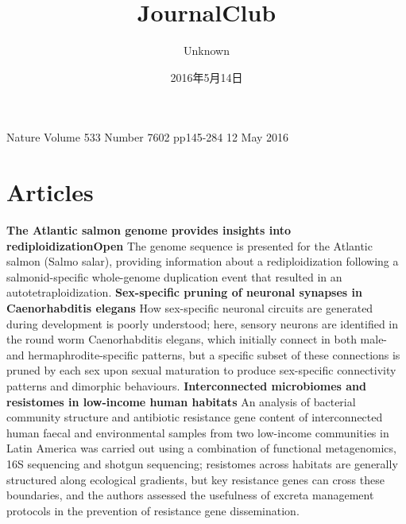 \documentclass[a4j]{jsarticle}
\begin{document}
\title{\vspace{-1.5cm}JournalClub}
\author{Unknown}
\date{2016年5月14日\vspace{-0.3cm}}
\maketitle
\noindent
Nature Volume 533 Number 7602 pp145-284 12 May 2016
\vspace{-5mm}
\section{Articles}
\noindent\textbf{The Atlantic salmon genome provides insights into rediploidizationOpen}
The genome sequence is presented for the Atlantic salmon (Salmo salar), providing information about a rediploidization following a salmonid-specific whole-genome duplication event that resulted in an autotetraploidization.
\vspace{3mm}
\noindent\textbf{Sex-specific pruning of neuronal synapses in Caenorhabditis elegans}
How sex-specific neuronal circuits are generated during development is poorly understood; here, sensory neurons are identified in the round worm Caenorhabditis elegans, which initially connect in both male- and hermaphrodite-specific patterns, but a specific subset of these connections is pruned by each sex upon sexual maturation to produce sex-specific connectivity patterns and dimorphic behaviours.
\vspace{3mm}
\noindent\textbf{Interconnected microbiomes and resistomes in low-income human habitats}
An analysis of bacterial community structure and antibiotic resistance gene content of interconnected human faecal and environmental samples from two low-income communities in Latin America was carried out using a combination of functional metagenomics, 16S sequencing and shotgun sequencing; resistomes across habitats are generally structured along ecological gradients, but key resistance genes can cross these boundaries, and the authors assessed the usefulness of excreta management protocols in the prevention of resistance gene dissemination.
\vspace{3mm}
\end{document}

